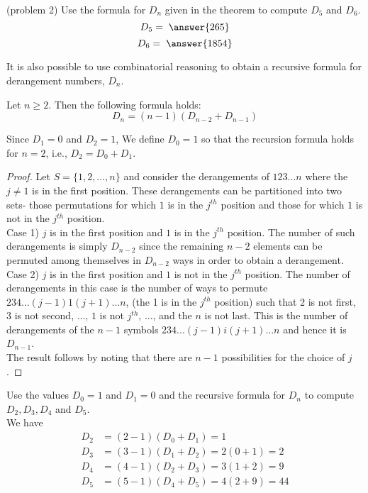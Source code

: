 \documentclass[handout]{ximera}
\begin{document}
\begin{problem}(problem 2)
Use the formula for $D_n$ given in the theorem to compute $D_5$ and $D_6$.\\
\[
D_5 = \; \answer{265}
\]
\[
D_6 = \; \answer{1854}
\]
\end{problem}

 




It is also possible to use combinatorial reasoning to obtain a recursive formula for 
derangement numbers, $D_n$.

\begin{proposition}
Let $n \geq 2$. Then the following formula holds:
\[
D_n = (n-1)(D_{n-2} + D_{n-1})
\]
\end{proposition}

\begin{remark}
Since $D_1 = 0$ and $D_2 = 1$, We define $D_0 = 1$ so that the recursion formula 
holds for $n=2$, i.e., $D_2 = D_0 + D_1$.
\end{remark}

\begin{proof}
Let $S = \{1, 2, ..., n\}$ and consider the 
derangements of $123...n$ where the $j \neq 1$ is in the first position. 
These derangements can be partitioned into two sets- those permutations for which $1$ is in 
the $j^{th}$ position and those for which $1$ is not in the $j^{th}$ position.\\
Case 1) $j$ is in the first position and $1$ is in the $j^{th}$ position. 
The number of such derangements is simply $D_{n-2}$ since the remaining $n-2$ elements can be permuted among themselves 
in $D_{n-2}$ ways in order to obtain a derangement.\\
Case 2) $j$ is in the first position and $1$ is not in the $j^{th}$ position. 
The number of derangements in this case is the number of ways to permute $234...(j-1)1(j+1)...n$,
(the 1 is in the $j^{th}$ position) such that 2 is not first, 
3 is not second, ..., $1$ is not $j^{th}$, ..., and the $n$ is not last. 
This is the number of derangements of the $n-1$ symbols $234...(j-1)i(j+1)...n$ and hence it is $D_{n-1}$.\\
The result follows by noting that there are $n-1$ possibilities for the choice of $j$.
\end{proof}

\begin{example}[example 3]
Use the values $D_0 = 1$ and $D_1 = 0$ and the recursive formula for $D_n$ to compute $D_2, D_3, D_4$ and $D_5$.\\
We have
\begin{align*}
D_2 &= (2-1)(D_0 + D_1) = 1\\
D_3 &= (3-1)(D_1 + D_2) = 2(0+1) = 2\\
D_4 &= (4-1)(D_2 + D_3) = 3(1+2) = 9\\
D_5 &= (5-1)(D_4 + D_5) = 4(2+9) = 44\\
\end{align*}
\end{example}
\end{document}
